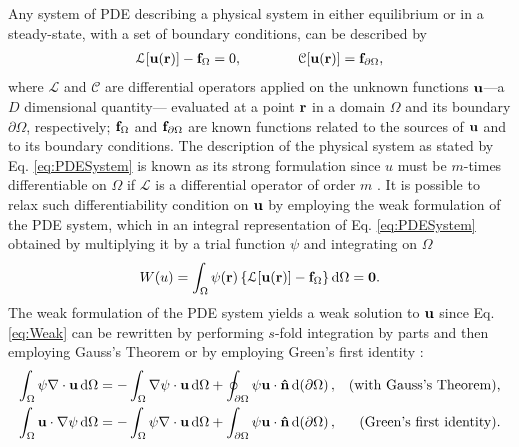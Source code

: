 
Any system of PDE describing a physical system in either equilibrium or in a steady-state, with a set of boundary conditions, can be described by \cite{dhatt_finite_2012}
%
\begin{align}
    \mathcal{L}[\vb{u}(\vb{r})] - \vb{f}_\Omega = 0,
    \qquad\qquad
    \mathcal{C}[\vb{u}(\vb{r})] = \vb{f}_{\partial\Omega},
\label{eq:PDESystem}
\end{align}
%
where $\mathcal{L}$ and $\mathcal{C}$ are differential operators applied on the unknown functions $\vb{u}$---a $D$ dimensional quantity--- evaluated at a point $\vb{r}$ in a domain $\Omega$ and its boundary $\partial\Omega$, respectively;  $\vb{f}_\Omega$ and $\vb{f}_{\partial\Omega}$ are known functions related to the sources of $\vb{u}$ and to its boundary conditions.  The description of the physical system as stated by Eq. \eqref{eq:PDESystem} is known as its strong formulation since $u$ must be $m$-times differentiable on $\Omega$ if $\mathcal{L}$ is a differential operator of order $m$ \cite{dhatt_finite_2012,larson_finite_2013}. It is possible to relax such differentiability condition on $\vb{u}$ by employing the weak formulation of the PDE system, which in an integral representation of Eq. \eqref{eq:PDESystem} obtained by multiplying it by a trial function $\psi$ and integrating on $\Omega$ \cite{dhatt_finite_2012,larson_finite_2013,fletcher_computational_1984}
%
\begin{align}
    W(u) = \int_\Omega \psi(\vb{r}) \left\{ \mathcal{L}[\vb{u}(\vb{r})] - \vb{f}_\Omega   \right\} \dd{\Omega} = \vb{0}.
    \label{eq:Weak}
\end{align}
%
The weak formulation of the PDE system yields a weak solution to $\vb{u}$ since Eq. \eqref{eq:Weak} can be rewritten by performing $s$-fold integration by parts and then  employing Gauss's Theorem or by employing Green's first identity \cite{larson_finite_2013}:
%
\begin{align}
    \int_\Omega \psi \nabla\cdot \vb{u}\dd{\Omega} &=  - \int_\Omega \nabla\psi \cdot \vb{u} \dd{\Omega} + \oint_{\partial\Omega} \psi \vb{u}\cdot \vu{n}\dd{(\partial\Omega)},
        & \mbox{(with Gauss's Theorem),}
        \label{eq:GT}
    \\
    \int_\Omega \vb{u}\cdot\nabla\psi \dd{\Omega} &=  - \int_\Omega \psi \nabla\cdot \vb{u}\dd{\Omega}  + \int_{\partial \Omega}\psi \vb{u}\cdot\vu{n}\dd{(\partial\Omega)},
        & \mbox{(Green's first identity).}
        \label{eq:G1I}
\end{align}
